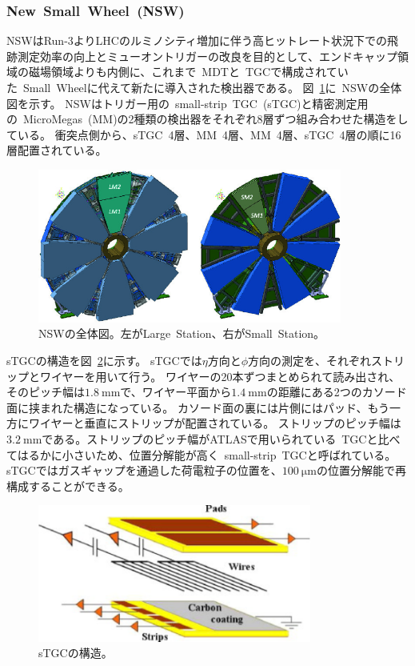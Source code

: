 \subsubsection{New~Small~Wheel~(NSW)}
NSWはRun-3よりLHCのルミノシティ増加に伴う高ヒットレート状況下での飛跡測定効率の向上とミューオントリガーの改良を目的として、エンドキャップ領域の磁場領域よりも内側に、これまで~MDTと~TGCで構成されていた~Small~Wheelに代えて新たに導入された検出器である。
図~\ref{fig:2-23}に~NSWの全体図を示す。
NSWはトリガー用の~small-strip~TGC~(sTGC)と精密測定用の~MicroMegas~(MM)の2種類の検出器をそれぞれ8層ずつ組み合わせた構造をしている。
衝突点側から、sTGC~4層、MM~4層、MM~4層、sTGC~4層の順に16層配置されている。

\begin{figure}[h]
  \centering
  \includegraphics[clip, width=10cm]{fig/2/NSW_structure.png}
  \caption{NSWの全体図\cite{article:ATLASNSWTDR}。左がLarge~Station、右がSmall~Station。}
  \label{fig:2-23}
\end{figure}

sTGCの構造を図~\ref{fig:2-24}に示す。
sTGCでは$\eta$方向と$\phi$方向の測定を、それぞれストリップとワイヤーを用いて行う。
ワイヤーの20本ずつまとめられて読み出され、そのピッチ幅は$\SI{1.8}{\mm}$で、ワイヤー平面から$\SI{1.4}{\mm}$の距離にある2つのカソード面に挟まれた構造になっている。
カソード面の裏には片側にはパッド、もう一方にワイヤーと垂直にストリップが配置されている。
ストリップのピッチ幅は$\SI{3.2}{\mm}$である。ストリップのピッチ幅がATLASで用いられている~TGCと比べてはるかに小さいため、位置分解能が高く~small-strip~TGCと呼ばれている。
sTGCではガスギャップを通過した荷電粒子の位置を、$\SI{100}{\um}$の位置分解能で再構成することができる。

\begin{figure}[h]
  \centering
  \includegraphics[clip, width=9cm]{fig/2/stgc-structure.pdf}
  \caption{sTGCの構造\cite{article:ATLASNSWTDR}。}
  \label{fig:2-24}
\end{figure}

